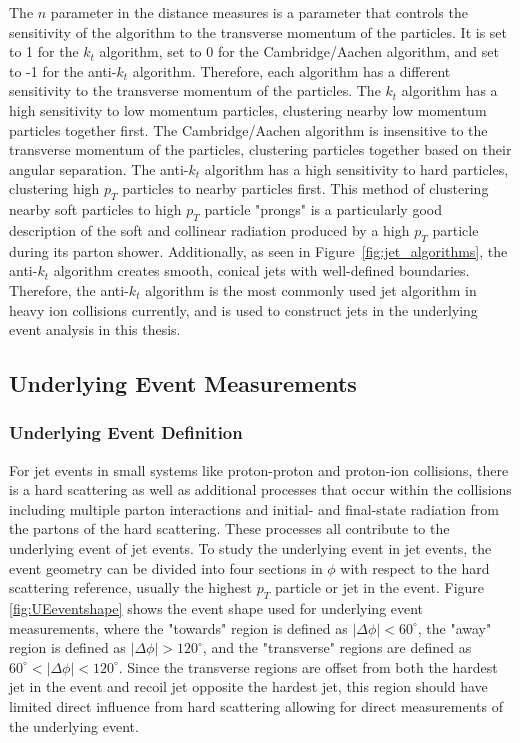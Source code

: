 The $n$ parameter in the distance measures is a parameter that controls the sensitivity of the algorithm to the transverse momentum of the particles.
It is set to 1 for the $k_{t}$ algorithm, set to 0 for the Cambridge/Aachen algorithm, and set to -1 for the anti-$k_{t}$ algorithm.
Therefore, each algorithm has a different sensitivity to the transverse momentum of the particles.
The $k_{t}$ algorithm has a high sensitivity to low momentum particles, clustering nearby low momentum particles together first. 
The Cambridge/Aachen algorithm is insensitive to the transverse momentum of the particles, clustering particles together based on their angular separation.
The anti-$k_{t}$ algorithm has a high sensitivity to hard particles, clustering high $p_{T}$ particles to nearby particles first.
This method of clustering nearby soft particles to high $p_{T}$ particle "prongs" is a particularly good description of the soft and collinear radiation produced by a high $p_{T}$ particle during its parton shower.
Additionally, as seen in Figure~\ref{fig:jet_algorithms}, the anti-$k_{t}$ algorithm creates smooth, conical jets with well-defined boundaries. 
Therefore, the anti-$k_{t}$ algorithm is the most commonly used jet algorithm in heavy ion collisions currently, and is used to construct jets in the underlying event analysis in this thesis.

\subsection{Underlying Event Measurements}
\label{sec:underlying_event_measurements}

\subsubsection{Underlying Event Definition}
For jet events in small systems like proton-proton and proton-ion collisions, there is a hard scattering as well as additional processes that occur within the collisions including multiple parton interactions and initial- and final-state radiation from the partons of the hard scattering.
These processes all contribute to the underlying event of jet events.
To study the underlying event in jet events, the event geometry can be divided into four sections in $\phi$ with respect to the hard scattering reference, usually the highest $p_{T}$ particle or jet in the event. 
Figure \ref{fig:UEeventshape} shows the event shape used for underlying event measurements, where the "towards" region is defined as $|\Delta\phi| < 60^\circ$, the "away" region is defined as $|\Delta\phi| > 120^\circ$, and the "transverse" regions are defined as $60^\circ < |\Delta\phi| < 120^\circ$.
Since the transverse regions are offset from both the hardest jet in the event and recoil jet opposite the hardest jet, this region should have limited direct influence from hard scattering allowing for direct measurements of the underlying event.

